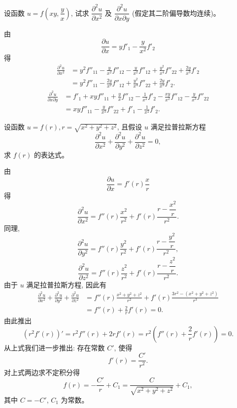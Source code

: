 \documentclass[UTF8,12pt,a4paper,fontset=fandol]{ctexart}
\begin{document}
\begin{example}\label{course-example-14-2-8}\quad 设函数 $u=f\left(xy,\dfrac yx\right)$, 试求 $\dfrac{\partial^2u}{\partial x^2}$ 及 $\dfrac{\partial^2u}{\partial x\partial y}$ (假定其二阶偏导数均连续)。

\end{example}
\begin{solve}\quad 由
\[
  \frac{\partial u}{\partial x}=yf'_1-\frac y{x^2}f'_2
\]
得
\[
\begin{aligned}
  \frac{\partial^2u}{\partial x^2}
  &=y^2f''_{11}-\frac y{x^2}f''_{12}
  -\frac y{x^2}f''_{12}+\frac{y^2}{x^4}f''_{22}
  +\frac{2y}{x^3}f'_2\\
  &=y^2f''_{11}-\frac{2y}{x^2}f''_{12}
  +\frac{y^2}{x^4}f''_{22}+\frac{2y}{x^3}f'_2.
\end{aligned}
\]
\[
\begin{aligned}
  \frac{\partial^2u}{\partial x\partial y}
  &=f'_1+xyf''_{11}+\frac yx f''_{12}
  -\frac1{x^2}f'_2-\frac{xy}{x^2}f''_{12}
  -\frac y{x^3}f''_{22}\\
  &=xyf''_{11}-\frac y{x^3}f''_{22}+f'_1-\frac1{x^2}f'_2.
\end{aligned}
\]

\end{solve}
\begin{example}\label{course-example-14-2-9}\quad 设函数 $u=f(r),r=\sqrt{x^2+y^2+z^2}$, 且假设 $u$ 满足拉普拉斯方程
\[
  \frac{\partial^2u}{\partial x^2}
  +\frac{\partial^2u}{\partial y^2}
  +\frac{\partial^2u}{\partial z^2}=0,
\]
求 $f(r)$ 的表达式。

\end{example}
\begin{solve}\quad 由
\[
  \frac{\partial u}{\partial x}=f'(r)\frac xr
\]
得
\[
  \frac{\partial^2u}{\partial x^2}
  =f''(r)\frac{x^2}{r^2}+f'(r)\frac{r-\dfrac{x^2}{r}}{r^2}.
\]
同理,
\[
  \frac{\partial^2u}{\partial y^2}
  =f''(r)\frac{y^2}{r^2}+f'(r)\frac{r-\dfrac{y^2}{r}}{r^2},
\]
\[
  \frac{\partial^2u}{\partial z^2}
  =f''(r)\frac{z^2}{r^2}+f'(r)\frac{r-\dfrac{z^2}{r}}{r^2}.
\]
由于 $u$ 满足拉普拉斯方程, 因此有
\[
\begin{aligned}
  \frac{\partial^2u}{\partial x^2}
  +\frac{\partial^2u}{\partial y^2}
  +\frac{\partial^2u}{\partial z^2}
  &=f''(r)\frac{x^2+y^2+z^2}{r^2}
  +f'(r)\frac{3r^2-(x^2+y^2+z^2)}{r^3}\\
  &=f''(r)+\frac2r f'(r)=0.
\end{aligned}
\]
由此推出
\[
  (r^2f'(r))'=r^2f''(r)+2rf'(r)
  =r^2\left(f''(r)+\frac2r f'(r)\right)=0.
\]
从上式我们进一步推出: 存在常数 $C'$, 使得
\[
  f'(r)=\frac{C'}{r^2}.
\]
对上式两边求不定积分得
\[
  f(r)=-\frac{C'}r+C_1=\frac C{\sqrt{x^2+y^2+z^2}}+C_1,
\]
其中 $C=-C'$, $C_1$ 为常数。

\end{solve}
\end{document}
